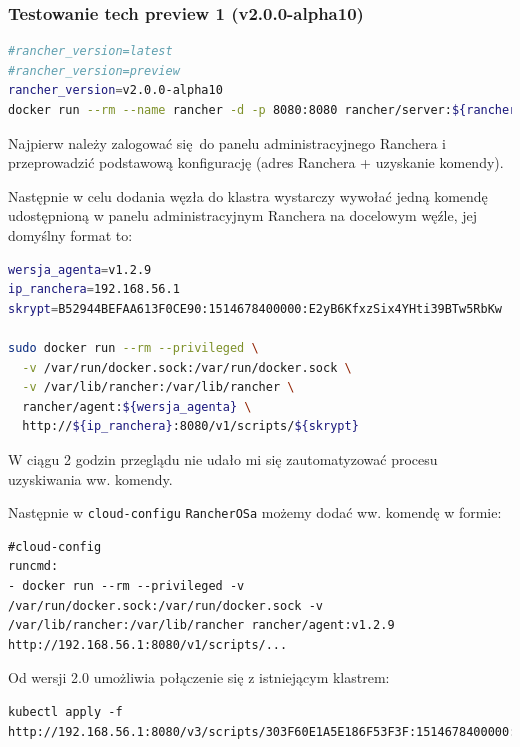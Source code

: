 \documentclass[a4paper,12pt,twoside,openany]{report}
\newcommand{\passthrough}[1]{#1}
\begin{document}
\hypertarget{testowanie-tech-preview-1-v2.0.0-alpha10}{%
\subsubsection{Testowanie tech preview 1
(v2.0.0-alpha10)}\label{testowanie-tech-preview-1-v2.0.0-alpha10}}

\begin{lstlisting}[language=bash]
#rancher_version=latest
#rancher_version=preview
rancher_version=v2.0.0-alpha10
docker run --rm --name rancher -d -p 8080:8080 rancher/server:${rancher_version}
\end{lstlisting}

Najpierw należy zalogować się~do panelu administracyjnego Ranchera i
przeprowadzić podstawową konfigurację (adres Ranchera + uzyskanie
komendy).

Następnie w celu dodania węzła do klastra wystarczy wywołać jedną
komendę~ udostępnioną w panelu administracyjnym Ranchera na docelowym
węźle, jej domyślny format to:

\begin{lstlisting}[language=bash]
wersja_agenta=v1.2.9
ip_ranchera=192.168.56.1
skrypt=B52944BEFAA613F0CE90:1514678400000:E2yB6KfxzSix4YHti39BTw5RbKw

sudo docker run --rm --privileged \
  -v /var/run/docker.sock:/var/run/docker.sock \
  -v /var/lib/rancher:/var/lib/rancher \
  rancher/agent:${wersja_agenta} \
  http://${ip_ranchera}:8080/v1/scripts/${skrypt}
\end{lstlisting}

W ciągu 2 godzin przeglądu nie udało mi się zautomatyzować procesu
uzyskiwania ww. komendy.

Następnie w \passthrough{\lstinline!cloud-configu!}
\passthrough{\lstinline!RancherOSa!} możemy dodać ww. komendę w formie:

\begin{lstlisting}
#cloud-config
runcmd:
- docker run --rm --privileged -v /var/run/docker.sock:/var/run/docker.sock -v /var/lib/rancher:/var/lib/rancher rancher/agent:v1.2.9 http://192.168.56.1:8080/v1/scripts/...
\end{lstlisting}

Od wersji 2.0 umożliwia połączenie się z istniejącym klastrem:

\begin{lstlisting}
kubectl apply -f http://192.168.56.1:8080/v3/scripts/303F60E1A5E186F53F3F:1514678400000:wstQFdHpOgHqKahoYdmsCXEWMW4.yaml
\end{lstlisting}
\end{document}
